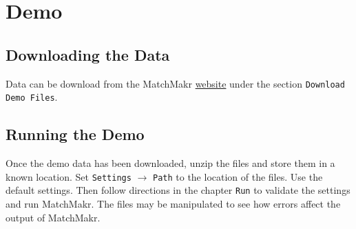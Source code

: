 \chapter{Demo}

\section{Downloading the Data}

Data can be download from the MatchMakr \href{\website}{website} under the section \texttt{Download Demo Files}.

\section{Running the Demo}

Once the demo data has been downloaded, unzip the files and store them in a known location.  Set \texttt{Settings} $\rightarrow$ \texttt{Path} to the location of the files.  Use the default settings.  Then follow directions in the chapter \texttt{Run} to validate the settings and run MatchMakr.  The files may be manipulated to see how errors affect the output of MatchMakr.